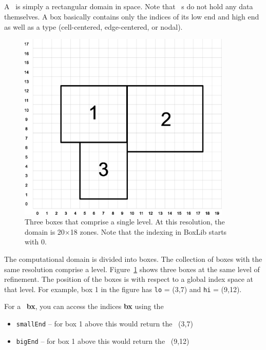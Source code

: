 \subsection{\BoxType}

A \BoxType\ is simply a rectangular domain in space.  Note that \BoxType~s
do not hold any data themselves. A box basically contains
only the indices of its low end and high end as well as a type 
(cell-centered, edge-centered, or nodal).

\begin{figure}[h]
\centering
\includegraphics[width=4.0in]{./BoxLib/index_grid2}
\caption{\label{fig:boxes} Three boxes that comprise a single level.
At this resolution, the domain is 20$\times$18 zones.  Note that the
indexing in BoxLib starts with $0$.}
\end{figure}

The computational domain is divided into boxes.  The collection of
boxes with the same resolution comprise a level.
Figure~\ref{fig:boxes} shows three boxes at the same level of
refinement.  The position of the boxes is with respect to a global
index space at that level.  For example, box 1 in the figure has 
{\tt lo} = (3,7) and {\tt hi} = (9,12).  

For a \BoxType\ {\bf bx},
you can access the indices {\bf bx} using the 

\begin{itemize}
\item {\tt smallEnd}  -- for box 1 above this would return the \IntVect\ (3,7)
\item {\tt bigEnd} -- for box 1 above this would return the \IntVect\ (9,12)
\end{itemize}

